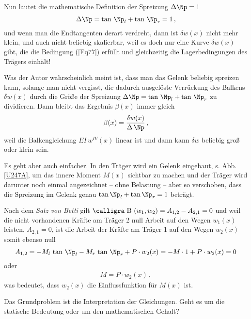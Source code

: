 Nun lautet die mathematische Definition der Spreizung \glq $\Delta \Np = 1$\grq{}
\begin{align} \label{Eq77}
\Delta \Np = \tan\,\Np_l + \tan\,\Np_r = 1\,,
\end{align}
und wenn man die Endtangenten derart verdreht, dann ist $\delta w(x)$ nicht mehr \glq klein\grq{}, und auch nicht beliebig skalierbar,  weil es doch nur  eine Kurve $\delta w(x)$ gibt, die die Bedingung (\ref{Eq77}) erf\"{u}llt und gleichzeitig die Lagerbedingungen des Tr\"{a}gers einh\"{a}lt!

Was der Autor wahrscheinlich meint ist, dass man das Gelenk beliebig spreizen kann, solange man nicht vergisst,  die dadurch ausgel\"{o}ste Verr\"{u}ckung des Balkens  $\delta w(x)$ durch die Gr\"{o}{\ss}e der Spreizung $\Delta \Np =  \tan\,\Np_l + \tan\,\Np_r$ zu dividieren. Dann bleibt das Ergebnis $\beta(x)$ immer gleich
\begin{align}
\beta(x) = \frac{\delta w(x)}{\Delta\,\Np}\,,
\end{align}
weil die Balkengleichung $EI\,w^{IV}(x)$ linear ist und dann kann $\delta w$ beliebig gro{\ss} oder klein sein.

Es geht aber auch einfacher. In den Tr\"{a}ger wird ein Gelenk eingebaut, s. Abb. \ref{U247A}, um das innere Moment $M(x)$ \glq sichtbar\grq{} zu machen und der Tr\"{a}ger wird darunter noch einmal angezeichnet -- ohne Belastung -- aber so verschoben, dass die Spreizung im Gelenk genau $\tan \Np_l + \tan \Np_r = 1$ betr\"{a}gt.

Nach dem {\em Satz von Betti\/} gilt $\text{\normalfont\calligra B\,\,}(w_1,w_2) = A_{1,2} - A_{2,1} = 0 $ und weil die nicht vorhandenen Kr\"{a}fte am Tr\"{a}ger 2 null Ar\-beit auf den Wegen $w_1(x)$ leisten, $A_{2,1} = 0$, ist die Ar\-beit der Kr\"{a}fte am Tr\"{a}ger 1 auf den Wegen $w_2(x)$ somit ebenso null
\begin{align}
A_{1,2} = -M_l\,\tan\,\Np_l - M_r\,\tan\,\Np_r + P \cdot w_2(x) = - M \cdot 1 + P\cdot w_2(x) = 0
\end{align}
oder
\begin{align}
M = P\cdot w_2(x)\,,
\end{align}
was bedeutet, dass $w_2(x)$ die Einflussfunktion f\"{u}r $M(x)$ ist.\\

\hspace*{-12pt}\colorbox{hellgrau}{\parbox{0.95\textwidth}{Das Grundproblem ist die Interpretation der Gleichungen. Geht es um die statische Bedeutung oder um den mathematischen Gehalt?}}\\

